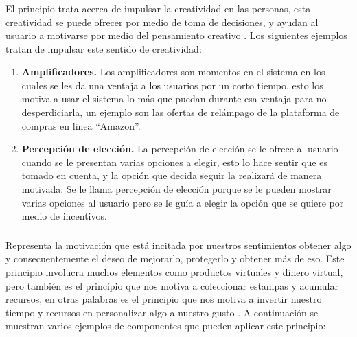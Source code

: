 \subsubsection{\principioIII} \label{subsec:prinpcioIII}
    
 El principio trata acerca de impulsar la creatividad en las personas, esta creatividad
 se puede ofrecer por medio de toma de decisiones, y ayudan al usuario a motivarse por medio
 del pensamiento creativo \cite[p. 126]{Octalysis}. Los siguientes ejemplos tratan de impulsar
 este sentido de creatividad:
    
    \begin{enumerate}
    \item
    {\bf Amplificadores.} \cite[p. 146]{Octalysis}
        Los amplificadores son momentos en el sistema en los cuales se les da una ventaja a los
        usuarios por un corto tiempo, esto los motiva a usar el sistema lo más que puedan durante
        esa ventaja para no desperdiciarla, un ejemplo son las ofertas de relámpago de la
        plataforma de compras en linea ``Amazon''.
        
    \item
    {\bf Percepción de elección.} \cite[p. 150]{Octalysis}
        La percepción de elección se le ofrece al usuario cuando se le presentan varias opciones
        a elegir, esto lo hace sentir que es tomado en cuenta, y la opción que decida seguir la
        realizará de manera motivada. Se le llama percepción de elección porque se le pueden
        mostrar varias opciones al usuario pero se le guía a elegir la opción que se quiere por
        medio de incentivos.
    \end{enumerate}
    
\subsubsection{\principioIV} \label{subsec:principioIV}
    
 Representa la motivación que está incitada por nuestros sentimientos obtener algo y consecuentemente el
 deseo de mejorarlo, protegerlo y obtener más de eso. Este principio involucra muchos elementos como
 productos virtuales y dinero virtual, pero también es el principio que nos motiva a coleccionar estampas
 y acumular recursos, en otras palabras es el principio que nos motiva a invertir nuestro tiempo
 y recursos en personalizar algo a nuestro gusto \cite[p. 161]{Octalysis}. A continuación se muestran
 varios ejemplos de componentes que pueden aplicar este principio:
    
